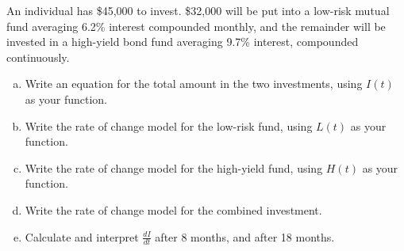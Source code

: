 \documentclass[notes]{subfiles}
\begin{document}
		\begin{ex}
			An individual has \$45,000 to invest.  \$32,000 will be put into a low-risk mutual fund averaging 6.2\% interest compounded monthly, and the remainder will be invested in a high-yield bond fund averaging 9.7\% interest, compounded continuously.
			\begin{enumerate}[(a)]
				\item Write an equation for the total amount in the two investments, using $I(t)$ as your function. 
				\item Write the rate of change model for the low-risk fund, using $L(t)$ as your function. 
				\item Write the rate of change model for the high-yield fund, using $H(t)$ as your function. 
				\item Write the rate of change model for the combined investment. 
				\item Calculate and interpret $\displaystyle \frac{dI}{dt}$ after 8 months, and after 18 months. 
			\end{enumerate}
		\end{ex}
		
	\clearpage
\end{document}
